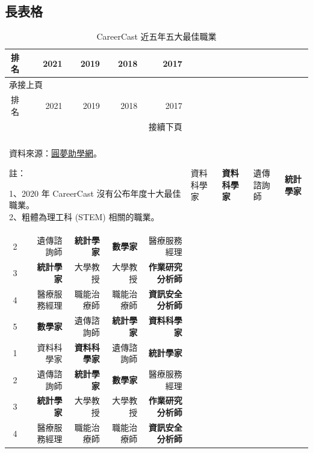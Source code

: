 \documentclass[utf8,12pt]{article} %
\begin{document}
\subsection{長表格}
%
%
\begin{longtable}{@{}crrrr@{}}
\caption{CareerCast 近五年五大最佳職業}\label{CareerCast}\\
\toprule
\midrule
排名 & 2021 &  2019 & 2018 & 2017 \\ %
\midrule
\endfirsthead %
%
\multicolumn{5}{l}{承接上頁}\\[2pt] %
\toprule
\midrule
排名 & 2021 &  2019 & 2018 & 2017 \\ %
\midrule
\endhead %
%
\midrule
\bottomrule
\multicolumn{5}{r}{接續下頁}\\[2pt] %
\endfoot\\[-10pt]  %
\multicolumn{5}{l}{\parbox{0.75\textwidth}{\footnotesize %
資料來源：\href{https://helpdreams.moe.edu.tw/hd/upload/20201211_1.pdf}{圓夢助學網}。\par\smallskip
註：\parbox[t]{0.7\textwidth}{\footnotesize %
1、2020 年 CareerCast 沒有公布年度十大最佳職業。\\
2、粗體為理工科 (STEM) 相關的職業。
}
}
}
\endlastfoot
1 & { 資料科學家} & \textbf{資料科學家}  &  遺傳諮詢師 & \textbf{統計學家} \\
2 & 遺傳諮詢師 & \textbf{統計學家} & \textbf{數學家}  & 醫療服務經理 \\
3 & \textbf{統計學家} & 大學教授  & 大學教授 & \textbf{作業研究分析師}\\
4 & 醫療服務經理 & 職能治療師  & 職能治療師 & \textbf{資訊安全分析師} \\
5 & \textbf{數學家} & 遺傳諮詢師 & \textbf{統計學家} & \textbf{資料科學家} \\
1 & { 資料科學家} & \textbf{資料科學家}  &  遺傳諮詢師 & \textbf{統計學家} \\
2 & 遺傳諮詢師 & \textbf{統計學家} & \textbf{數學家}  & 醫療服務經理 \\
3 & \textbf{統計學家} & 大學教授  & 大學教授 & \textbf{作業研究分析師}\\
4 & 醫療服務經理 & 職能治療師  & 職能治療師 & \textbf{資訊安全分析師} \\

\end{longtable}
\end{document}
